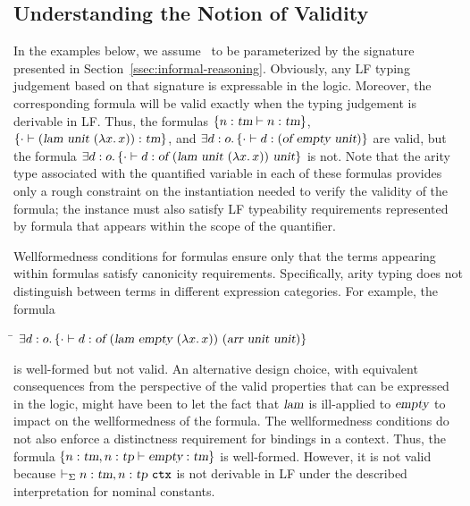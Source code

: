 \subsection{Understanding the Notion of Validity}\label{ssec:logic-examples}

In the examples below, we assume \logic\ to be parameterized by the
signature presented in Section~\ref{ssec:informal-reasoning}.
%
Obviously, any LF typing judgement based on that signature is expressable
in the logic.
%
Moreover, the corresponding formula will be valid exactly when the
typing judgement is derivable in LF.
%
Thus, the formulas $\left\{n : \mbox{\sl tm} \vdash n:\mbox{\sl tm}\right\}$,
$\left\{\cdot \vdash (\mbox{\sl lam}\  \mbox{\sl unit}\  (\lambda {x}.{\mkern 3mu} x)) : \mbox{\sl tm}\right\}$, and
$\exists d:o. \left\{\cdot \vdash d : (\mbox{\sl of} \  \mbox{\sl empty}\ 
    \mbox{\sl unit})\right\}$
are valid, but the formula
$\exists d:o. \left\{\cdot \vdash d:\mbox{\sl of} \ 
    (\mbox{\sl lam} \  \mbox{\sl unit}\  (\lambda {x}.{\mkern 3mu} x))\  \mbox{\sl unit}\right\}$
is not.
%
Note that the arity type associated with the quantified variable in
each of these formulas provides only a rough constraint on the
instantiation needed to verify the validity of the formula; 
the instance must also satisfy LF typeability requirements
represented by formula that appears within the scope of the
quantifier.

Wellformedness conditions for formulas ensure only that the terms
appearing within formulas satisfy canonicity requirements.
%
Specifically, arity typing does not distinguish between terms in
different expression categories.
%
For example, the formula
\begin{tabbing}
\qquad\=\kill
\> $\exists d:o. \left\{\cdot \vdash d:\mbox{\sl of} \  (\mbox{\sl lam} \  \mbox{\sl empty} \ 
    (\lambda {x}.{\mkern 3mu} x))\  (\mbox{\sl arr}\  \mbox{\sl unit}\  \mbox{\sl unit})\right\}$
\end{tabbing}
is well-formed but not valid.
%
An alternative design choice, with equivalent consequences from the
perspective of the valid properties that can be expressed in the
logic, might have been to let the fact that $\mbox{\sl lam}$ is ill-applied to
$\mbox{\sl empty}$ to impact on the wellformedness of the formula.
%
The wellformedness conditions do not also enforce a distinctness
requirement for bindings in a context.
%
Thus, the formula $\left\{n : \mbox{\sl tm}, n : \mbox{\sl tp} \vdash \mbox{\sl empty} : \mbox{\sl tm}\right\}$ is
well-formed.
%
However, it is not valid because $\vdash_{\Sigma} n : \mbox{\sl tm}, n : \mbox{\sl tp}\ \mbox{\tt ctx}$ is not
derivable in LF under the described interpretation for nominal
constants.
%

